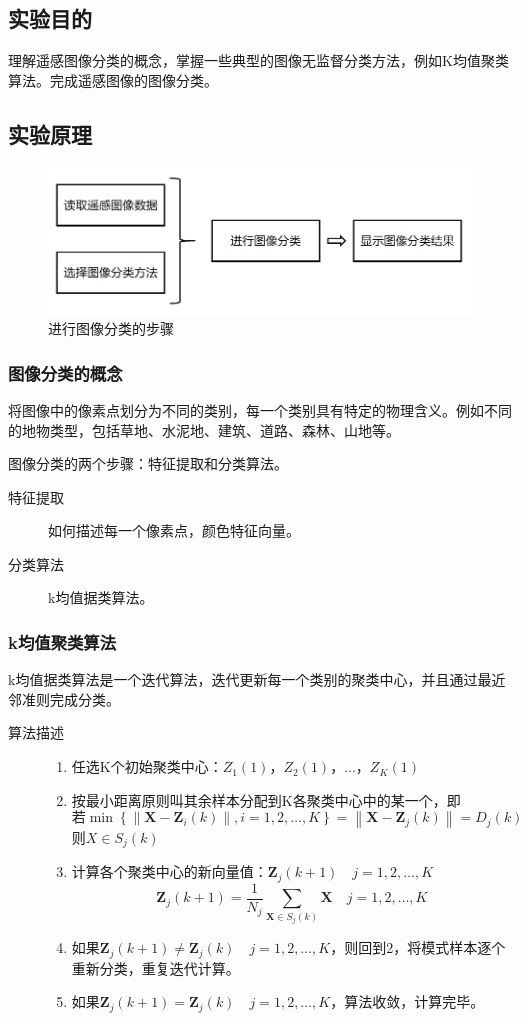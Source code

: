 \subsection{实验目的}
理解遥感图像分类的概念，掌握一些典型的图像无监督分类方法，例如K均值聚类算法。完成遥感图像的图像分类。
\subsection{实验原理}
\begin{figure}[H]
	\centering
	\includegraphics[width=0.7\linewidth]{figure/classification_flowchart.png}
	\caption{进行图像分类的步骤}
\end{figure}
\subsubsection{图像分类的概念}
将图像中的像素点划分为不同的类别，每一个类别具有特定的物理含义。例如不同的地物类型，包括草地、水泥地、建筑、道路、森林、山地等。

图像分类的两个步骤：特征提取和分类算法。
\begin{description}
	\item[特征提取] 如何描述每一个像素点，颜色特征向量。
	\item[分类算法] k均值据类算法。
\end{description}
\subsubsection{k均值聚类算法}
k均值据类算法是一个迭代算法，迭代更新每一个类别的聚类中心，并且通过最近邻准则完成分类。
\begin{description}
	\item[算法描述] \begin{enumerate}
		\item 任选K个初始聚类中心：$Z_1(1)$，$Z_2(1)$，$\dots$，$Z_K(1)$
		\item 按最小距离原则叫其余样本分配到K各聚类中心中的某一个，即
		\[ \text{若} \min\left\lbrace \left\| \mathbf{X}-\mathbf{Z}_i(k) \right\|,i=1,2,\dots,K \right\rbrace=\left\| \mathbf{X}-\mathbf{Z}_j(k) \right\|=D_j(k) \]
		则$X\in S_j(k)$
		\item  计算各个聚类中心的新向量值：$\mathbf{Z}_j(k+1)\quad j=1,2,\dots,K$
		\[ \mathbf{Z}_j(k+1)=\frac{1}{N_j}\sum_{\mathbf{X}\in S_j(k)}\mathbf{X}\quad j=1,2,\dots,K \]
		\item 如果$\mathbf{Z}_j(k+1)\neq\mathbf{Z}_j(k)\quad j=1,2,\dots,K$，则回到2，将模式样本逐个重新分类，重复迭代计算。
		\item 如果$\mathbf{Z}_j(k+1)=\mathbf{Z}_j(k)\quad j=1,2,\dots,K$，算法收敛，计算完毕。
	\end{enumerate} 
\end{description}
